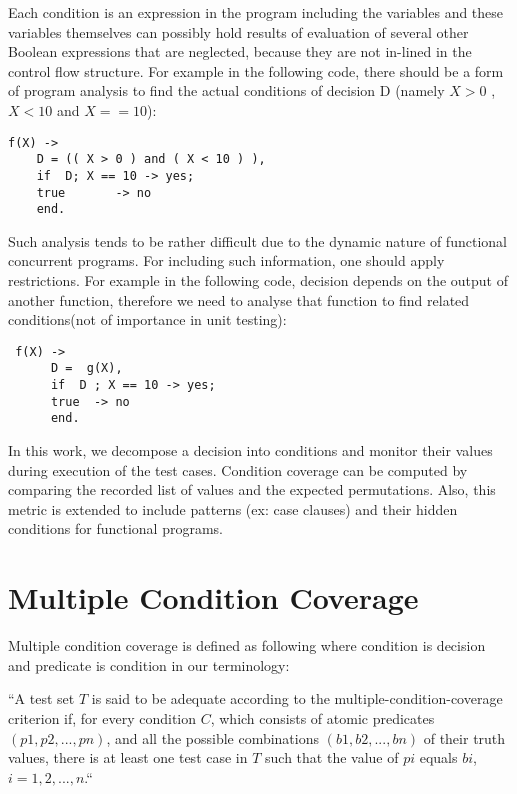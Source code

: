 \documentclass[12pt,a4paper]{report}
\begin{document}
Each condition is an expression in the program including the variables and these variables themselves can possibly hold results of evaluation of
 several other Boolean expressions that are neglected, because they are not in-lined in the control flow structure. For example in the following code, there
 should be a form of program analysis to find the actual conditions of decision D (namely $X>0$ , $X<10$ and $X==10$):

\begin{lstlisting}
f(X) -> 
    D = (( X > 0 ) and ( X < 10 ) ),
    if	D; X == 10 -> yes;
	true       -> no
    end.  
\end{lstlisting}

Such analysis tends to be rather difficult due to the dynamic nature of functional concurrent programs. For including such information, one should apply
 restrictions. For example in the following code, decision depends on the output of another function, therefore we need to analyse that function to find
 related conditions(not of importance in unit testing):

\begin{lstlisting}
 f(X) -> 
      D =  g(X),
      if  D ; X == 10 -> yes;
	  true  -> no
      end.
\end{lstlisting}

In this work, we decompose a decision into conditions and monitor their values during execution of the test cases. Condition coverage can be computed
 by comparing the recorded list of values and the expected permutations. Also, this metric is extended to include patterns (ex: case clauses) and their
 hidden conditions for functional programs. %

\section{Multiple Condition Coverage}
Multiple condition coverage is defined as following where condition is decision and predicate is condition in our terminology:

“A test set $T$ is said to be adequate according to the multiple-condition-coverage criterion if, for every condition $C$, which consists of atomic
 predicates $(p1, p2,  . . .  , pn)$, and all the possible combinations $(b1, b2,  . . .  , bn)$ of their truth values, there is at least one test case in
 $T$ such that the value of $pi$ equals $bi$, $i = 1, 2,  .  .  .  , n$.“\cite{Zhu:1997:SUT:267580.267590}
\end{document}

